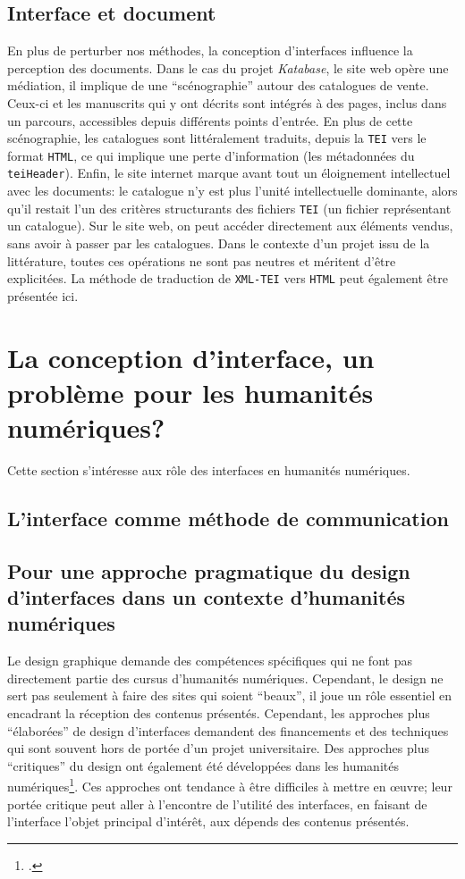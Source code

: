 \documentclass[a4paper, 12pt, twoside]{book}
\newcommand{\html}{\texttt{HTML}}
\newcommand{\ktb}{\textit{Katabase}}
\newcommand{\tei}{\texttt{TEI}}
\newcommand{\xmltei}{\texttt{XML-TEI}}
\begin{document}
\subsection{Interface et document}
En plus de perturber nos méthodes, la conception d'interfaces influence la perception des documents. Dans le cas du projet \ktb, le site web opère une médiation, il implique de une \enquote{scénographie} autour des catalogues de vente. Ceux-ci et les manuscrits qui y ont décrits sont intégrés à des pages, inclus dans un parcours, accessibles depuis différents points d'entrée. En plus de cette scénographie, les catalogues sont littéralement traduits, depuis la \tei{} vers le format \html{}, ce qui implique une perte d'information (les métadonnées du \texttt{teiHeader}). Enfin, le site internet marque avant tout un éloignement intellectuel avec les documents: le catalogue n'y est plus l'unité intellectuelle dominante, alors qu'il restait l'un des critères structurants des fichiers \tei{} (un fichier représentant un catalogue). Sur le site web, on peut accéder directement aux éléments vendus, sans avoir à passer par les catalogues. Dans le contexte d'un projet issu de la littérature, toutes ces opérations ne sont pas neutres et méritent d'être explicitées. La méthode de traduction de \xmltei{} vers \html{} peut également être présentée ici.


\section{La conception d'interface, un problème pour les humanités numériques?}
Cette section s'intéresse aux rôle des interfaces en humanités numériques.

\subsection{L'interface comme méthode de communication}


\subsection{Pour une approche pragmatique du design d'interfaces dans un contexte d'humanités numériques}
Le design graphique demande des compétences spécifiques qui ne font pas directement partie des cursus d'humanités numériques. Cependant, le design ne sert pas seulement à faire des sites qui soient \enquote{beaux}, il joue un rôle essentiel en encadrant la réception des contenus présentés. Cependant, les approches plus \enquote{élaborées} de design d'interfaces demandent des financements et des techniques qui sont souvent hors de portée d'un projet universitaire. Des approches plus \enquote{critiques} du design ont également été développées dans les humanités numériques\footcite{drucker_visualisation_2020}. Ces approches ont tendance à être difficiles à mettre en œuvre; leur portée critique peut aller à l'encontre de l'utilité des interfaces, en faisant de l'interface l'objet principal d'intérêt, aux dépends des contenus présentés. 
\end{document}
